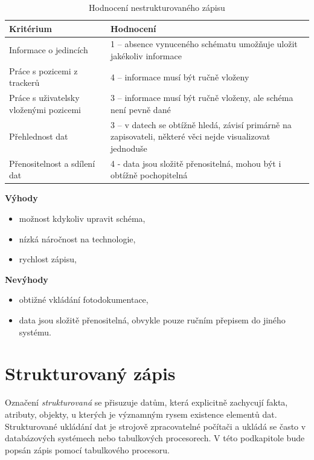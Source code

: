 \begin{table}[H]
	\begin{tabularx}{\textwidth}{ | X | X | }
		\hline
		Kritérium                              & Hodnocení \\
 		\hline			
		Informace o jedincích                  & 1 -- absence vynuceného schématu umožňuje uložit jakékoliv informace          \\
		\hline
		Práce s pozicemi z trackerů            & 4 -- informace musí být ručně vloženy          \\
		\hline
		Práce s uživatelsky vloženými pozicemi & 3 -- informace musí být ručně vloženy, ale schéma není pevně dané          \\
		\hline
		Přehlednost dat                        & 3 -- v datech se obtížně hledá, závisí primárně na zapisovateli, některé věci nejde visualizovat jednoduše          \\
		\hline
		Přenositelnost a sdílení dat           & 4 - data jsou složitě přenositelná, mohou být i obtížně pochopitelná          \\
		\hline	
	\end{tabularx}
	\caption{Hodnocení nestrukturovaného zápisu}
\end{table}
\clearpage
\textbf{Výhody}
\nolisttopbreak
\begin{itemize}
	\item možnost kdykoliv upravit schéma,
	\item nízká náročnost na technologie,
	\item rychlost zápisu,
\end{itemize}

\textbf{Nevýhody}
\nolisttopbreak
\begin{itemize}
	\item obtižné vkládání fotodokumentace,
	\item data jsou složitě přenositelná, obvykle pouze ručním přepisem do jiného systému.
\end{itemize}

\section{Strukturovaný zápis}

Označení \emph{strukturovaná} se přisuzuje datům, která explicitně zachycují fakta, atributy, objekty, u kterých je významným rysem existence elementů dat. Strukturované ukládání dat je strojově zpracovatelné počítači a ukládá se často v databázových systémech \cite{sklenak2001data} nebo tabulkových procesorech. V této podkapitole bude popsán zápis pomocí tabulkového procesoru.

